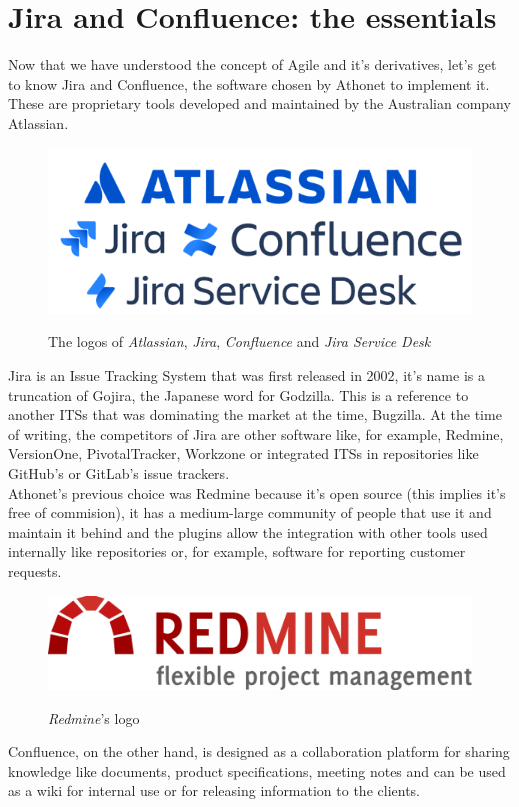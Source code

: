 \chapter{Jira and Confluence: the essentials}
\label{chapter_4}
	Now that we have understood the concept of Agile and it's derivatives, let's get to know Jira and Confluence, the software chosen by Athonet to implement it.
	These are proprietary tools developed and maintained by the Australian company Atlassian.
	\begin{figure}[H]
		\centering
		\includegraphics[width=.7\textwidth]{resources/atlassian_logo}\\
		\caption{The logos of \textit{Atlassian}, \textit{Jira}, \textit{Confluence} and \textit{Jira Service Desk}}
	\end{figure}
	Jira is an Issue Tracking System that was first released in 2002, it's name is a truncation of Gojira, the Japanese word for Godzilla.
	This is a reference to another ITSs that was dominating the market at the time, Bugzilla.
	At the time of writing, the competitors of Jira are other software like, for example, Redmine, VersionOne, PivotalTracker, Workzone or integrated ITSs in repositories like GitHub's or GitLab's issue trackers\cite{jira-alternatives}.\\
	Athonet's previous choice was Redmine because it's open source (this implies it's free of commision), it has a medium-large community of people that use it and maintain it behind and the plugins allow the integration with other tools used internally like repositories or, for example, software for reporting customer requests.
	\begin{figure}[H]
		\centering
		\includegraphics[width=.6\textwidth]{resources/redmine_logo}\\
		\caption{\textit{Redmine}'s logo}
	\end{figure}
	Confluence, on the other hand, is designed as a collaboration platform for sharing knowledge like documents, product specifications, meeting notes and can be used as a wiki for internal use or for releasing information to the clients.\\

